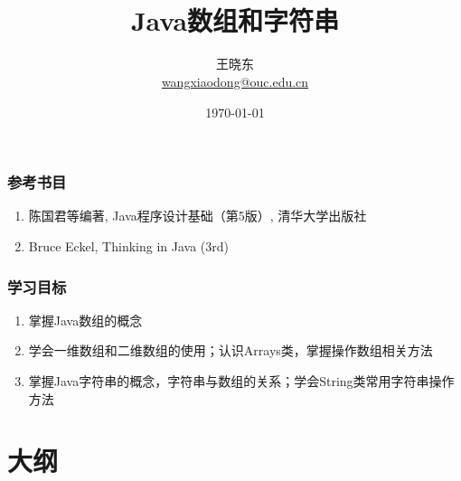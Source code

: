 
\title[Wang Xiaodong]{\\  
  Java数组和字符串}
\author[王晓东]{王晓东\\
  \href{mailto:wangxiaodong@ouc.edu.cn}{\footnotesize wangxiaodong@ouc.edu.cn}}
\date{\today}


 \frame{\titlepage}

\begin{frame}
\frametitle{参考书目}
\begin{enumerate}
\item 陈国君等编著, Java程序设计基础（第5版）, 清华大学出版社
\item Bruce Eckel, Thinking in Java (3rd)
\end{enumerate}  
\end{frame}

\begin{frame}
  \frametitle{学习目标}
  \begin{enumerate}
  \item 掌握Java数组的概念
  \item 学会一维数组和二维数组的使用；认识Arrays类，掌握操作数组相关方法
  \item 掌握Java字符串的概念，字符串与数组的关系；学会String类常用字符串操作方法
  \end{enumerate}
\end{frame}

\section*{大纲}

